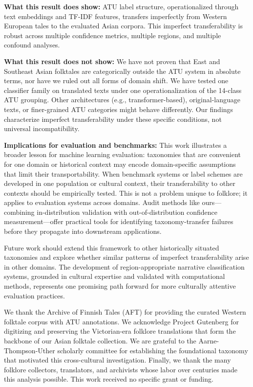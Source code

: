\documentclass{article}
\begin{document}
\textbf{What this result does show:} ATU label structure, operationalized through text embeddings and TF-IDF features, transfers imperfectly from Western European tales to the evaluated Asian corpora. This imperfect transferability is robust across multiple confidence metrics, multiple regions, and multiple confound analyses.

\textbf{What this result does not show:} We have not proven that East and Southeast Asian folktales are categorically outside the ATU system in absolute terms, nor have we ruled out all forms of domain shift. We have tested one classifier family on translated texts under one operationalization of the 14-class ATU grouping. Other architectures (e.g., transformer-based), original-language texts, or finer-grained ATU categories might behave differently. Our findings characterize imperfect transferability under these specific conditions, not universal incompatibility.

\textbf{Implications for evaluation and benchmarks:} This work illustrates a broader lesson for machine learning evaluation: taxonomies that are convenient for one domain or historical context may encode domain-specific assumptions that limit their transportability. When benchmark systems or label schemes are developed in one population or cultural context, their transferability to other contexts should be empirically tested. This is not a problem unique to folklore; it applies to evaluation systems across domains. Audit methods like ours---combining in-distribution validation with out-of-distribution confidence measurement---offer practical tools for identifying taxonomy-transfer failures before they propagate into downstream applications.

Future work should extend this framework to other historically situated taxonomies and explore whether similar patterns of imperfect transferability arise in other domains. The development of region-appropriate narrative classification systems, grounded in cultural expertise and validated with computational methods, represents one promising path forward for more culturally attentive evaluation practices.

\begin{ack}

We thank the Archive of Finnish Tales (AFT) for providing the curated Western folktale corpus with ATU annotations. We acknowledge Project Gutenberg for digitizing and preserving the Victorian-era folklore translations that form the backbone of our Asian folktale collection. We are grateful to the Aarne-Thompson-Uther scholarly committee for establishing the foundational taxonomy that motivated this cross-cultural investigation. Finally, we thank the many folklore collectors, translators, and archivists whose labor over centuries made this analysis possible. This work received no specific grant or funding.

\end{ack}
\end{document}
